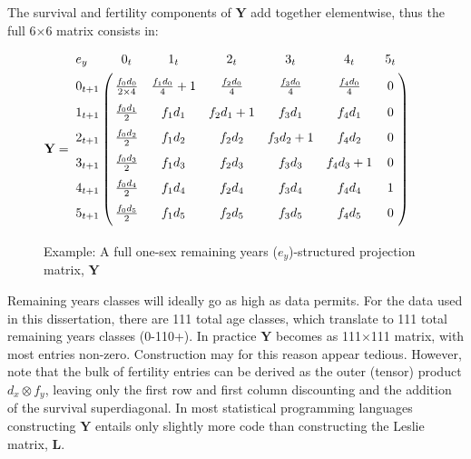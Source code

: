 The survival and fertility components of $\textbf{Y}$ add together elementwise,
thus the full 6$\times$6 matrix consists in:

\begin{figure}[h!]
\centering
\caption*{Example: A full one-sex remaining years ($e_y$)-structured projection
matrix, $\textbf{Y}$} 
$\textbf{Y} = \bordermatrix{
  {e_y } \vspace{.6em} & 0_t  & 1_t  & 2_t  & 3_t  & 4_t  & 5_t\cr 
  0_{t+1} \vspace{.6em}& \tfrac{f_0d_0}{2 \times 4} &
   \tfrac{f_1d_0}{4} + 1 & \tfrac{f_2d_0}{4} & \tfrac{f_3d_0}{4} &
   \tfrac{f_4d_0}{4}& 0 \cr 1_{t+1} \vspace{.6em}& \tfrac{f_0d_1}{2} & f_1d_1 & f_2d_1 + 1 & f_3d_1 &
   f_4d_1 & 0 \cr 2_{t+1} \vspace{.6em}& \tfrac{f_0d_2}{2} & f_1d_2 & f_2d_2 & f_3d_2 + 1 &
   f_4d_2 & 0 \cr 3_{t+1} \vspace{.6em}& \tfrac{f_0d_3}{2} & f_1d_3 & f_2d_3 & f_3d_3 & f_4d_3
   + 1 & 0 \cr 4_{t+1} \vspace{.6em}& \tfrac{f_0d_4}{2} & f_1d_4 & f_2d_4 &
   f_3d_4 & f_4d_4 & 1 \cr 5_{t+1} \vspace{.6em}& \tfrac{f_0d_5}{2} & f_1d_5 & f_2d_5 & f_3d_5 & f_4d_5 & 0 }$
\end{figure}

Remaining years classes will ideally go as high as data permits. For the data
used in this dissertation, there are 111 total age classes, which translate
to 111 total remaining years classes (0-110+). In practice $\textbf{Y}$ becomes
as 111$\times$111 matrix, with most entries non-zero. Construction may for this
reason appear tedious. However, note that the bulk of fertility entries can be
derived as the outer (tensor) product $d_x \otimes f_y$, leaving only the first
row and first column discounting and the addition of the survival superdiagonal.
In most statistical programming languages constructing $\textbf{Y}$ entails only
slightly more code than constructing the Leslie matrix, $\textbf{L}$.


